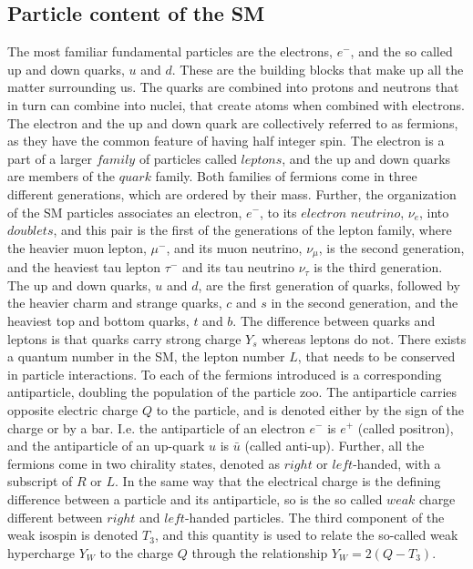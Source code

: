 \subsection*{Particle content of the SM}  
\noindent\justify
The most familiar fundamental particles are the electrons, $e^{-}$, and the so called up and down quarks, $u$ and $d$. 
These are the building blocks that make up all the matter surrounding us. 
The quarks are combined into protons and neutrons that in turn can combine into nuclei, that create atoms when combined with electrons. 
The electron and the up and down quark are collectively referred to as fermions, as they have the common feature of having half integer spin. 
The electron is a part of a larger $family$ of particles called $leptons$, and the up and down quarks are members of the $quark$ family.
Both families of fermions come in three different generations, which are ordered by their mass. 
Further, the organization of the SM particles associates an electron, $e^{-}$, to its $electron$ $neutrino$, $\nu_{e}$, into $doublets$, and this pair is the first of the generations of the lepton family, where the heavier muon lepton, $\mu^{-}$, and its muon neutrino, $\nu_{\mu}$, is the second generation, and the heaviest tau lepton $\tau^{-}$ and its tau neutrino $\nu_{\tau}$ is the third generation.  
The up and down quarks, $u$ and $d$, are the first generation of quarks, followed by the heavier charm and strange quarks, $c$ and $s$ in the second generation, and the heaviest top and bottom quarks, $t$ and $b$. 
The difference between quarks and leptons is that quarks carry strong charge $Y_{s}$ whereas leptons do not.
There exists a quantum number in the SM, the lepton number $L$, that needs to be conserved in particle interactions.
To each of the fermions introduced is a corresponding antiparticle, doubling the population of the particle zoo. 
The antiparticle carries opposite electric charge $Q$ to the particle, and is denoted either by the sign of the charge or by a bar. 
I.e. the antiparticle of an electron $e^{-}$ is $e^{+}$ (called positron), and the antiparticle of an up-quark $u$ is $\bar{u}$ (called anti-up). 
Further, all the fermions come in two chirality states, denoted as $right$ or $left$-handed, with a subscript of $R$ or $L$. 
In the same way that the electrical charge is the defining difference between a particle and its antiparticle, so is the so called $weak$ charge different between $right$ and $left$-handed particles. 
The third component of the weak isospin is denoted $T_{3}$, and this quantity is used to relate the so-called weak hypercharge $Y_{W}$ to the charge $Q$ through the relationship $Y_{W}=2(Q-T_{3})$. 

